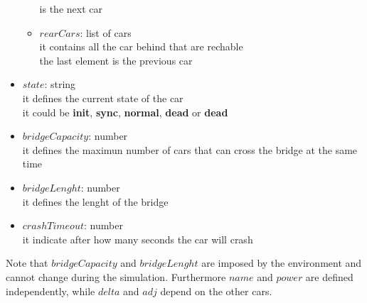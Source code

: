 \begin{itemize}
\begin{itemize}
         is the next car
        \item $rearCars$: list of cars\\ it contains all the car behind that are rechable\\ the last element
         is the previous car
    \end{itemize} 
    \item $state$: string\\ it defines the current state of the car\\ it could be \textbf{init}, \textbf{sync}, \textbf{normal}, \textbf{dead} or \textbf{dead}
    \item $bridgeCapacity$: number\\ it defines the maximun number of cars that can cross the bridge
    at the same time
    \item $bridgeLenght$: number\\ it defines the lenght of the bridge
    \item $crashTimeout$: number\\ it indicate after how many seconds the car will crash
\end{itemize}

Note that $bridgeCapacity$ and $bridgeLenght$ are imposed by the environment and cannot change during the
simulation. Furthermore $name$ and $power$ are defined independently, while $delta$ and $adj$ 
depend on the other cars.\\

